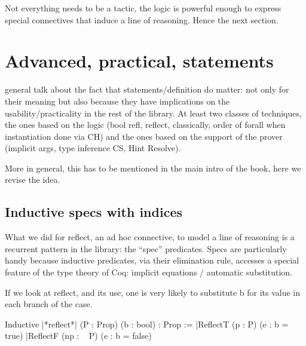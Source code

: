 





Not everything needs to be a tactic, the logic is powerful
enough to express special connectives that induce a line of
reasoning. Hence the next section.

\section{Advanced, practical, statements}

general talk about the fact that statements/definition do matter: not only for
their meaning but also because they have implications on the
usability/practicality in the rest of the library.  At least two classes of
techniques, the ones based on the logic (bool refl, reflect, classically, order
of forall when instantiation done via CH) and the ones based on the support of
the prover (implicit args, type inference CS, Hint Resolve).

More in general, this has to be mentioned in the main intro of the book, here
we revise the idea.

\subsection{Inductive specs with indices}
What we did for reflect, an ad hoc connective, to model a line of reasoning is
a recurrent pattern in the \mcbMC{} library: the ``spec'' predicates.  Specs
are particularly handy  because inductive predicates, via their elimination
rule, accesses a special feature of the type theory of Coq: implicit equations
/ automatic substitution.

If we look at reflect, and its use, one is very likely to substitute b
for its value in each branch of the case.

\begin{coq}{}{}
Inductive |*reflect*| (P : Prop) (b : bool) : Prop :=
|ReflectT (p : P)    (e : b = true)
|ReflectF (np : ~ P) (e : b = false)
\end{coq}

